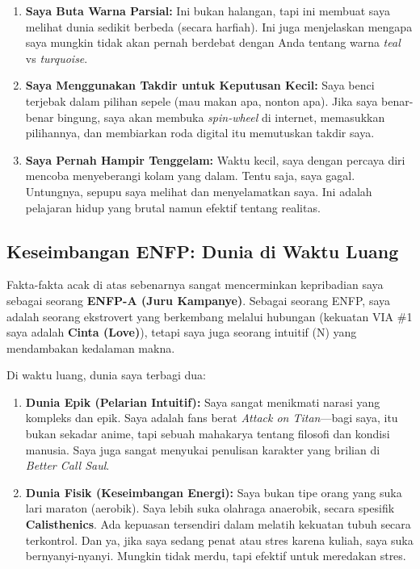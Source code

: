 \documentclass[
  letterpaper,
  DIV=11,
  numbers=noendperiod]{scrreprt}
\providecommand{\tightlist}{%
  \setlength{\itemsep}{0pt}\setlength{\parskip}{0pt}}
\begin{document}
\begin{enumerate}
\def\labelenumi{\arabic{enumi}.}
\tightlist
\item
  \textbf{Saya Buta Warna Parsial:} Ini bukan halangan, tapi ini membuat
  saya melihat dunia sedikit berbeda (secara harfiah). Ini juga
  menjelaskan mengapa saya mungkin tidak akan pernah berdebat dengan
  Anda tentang warna \emph{teal} vs \emph{turquoise}.
\item
  \textbf{Saya Menggunakan Takdir untuk Keputusan Kecil:} Saya benci
  terjebak dalam pilihan sepele (mau makan apa, nonton apa). Jika saya
  benar-benar bingung, saya akan membuka \emph{spin-wheel} di internet,
  memasukkan pilihannya, dan membiarkan roda digital itu memutuskan
  takdir saya.
\item
  \textbf{Saya Pernah Hampir Tenggelam:} Waktu kecil, saya dengan
  percaya diri mencoba menyeberangi kolam yang dalam. Tentu saja, saya
  gagal. Untungnya, sepupu saya melihat dan menyelamatkan saya. Ini
  adalah pelajaran hidup yang brutal namun efektif tentang realitas.
\end{enumerate}

\subsection{Keseimbangan ENFP: Dunia di Waktu
Luang}\label{keseimbangan-enfp-dunia-di-waktu-luang}

Fakta-fakta acak di atas sebenarnya sangat mencerminkan kepribadian saya
sebagai seorang \textbf{ENFP-A (Juru Kampanye)}. Sebagai seorang ENFP,
saya adalah seorang ekstrovert yang berkembang melalui hubungan
(kekuatan VIA \#1 saya adalah \textbf{Cinta (Love)}), tetapi saya juga
seorang intuitif (N) yang mendambakan kedalaman makna.

Di waktu luang, dunia saya terbagi dua:

\begin{enumerate}
\def\labelenumi{\arabic{enumi}.}
\item
  \textbf{Dunia Epik (Pelarian Intuitif):} Saya sangat menikmati narasi
  yang kompleks dan epik. Saya adalah fans berat \emph{Attack on
  Titan}---bagi saya, itu bukan sekadar anime, tapi sebuah mahakarya
  tentang filosofi dan kondisi manusia. Saya juga sangat menyukai
  penulisan karakter yang brilian di \emph{Better Call Saul}.
\item
  \textbf{Dunia Fisik (Keseimbangan Energi):} Saya bukan tipe orang yang
  suka lari maraton (aerobik). Saya lebih suka olahraga anaerobik,
  secara spesifik \textbf{Calisthenics}. Ada kepuasan tersendiri dalam
  melatih kekuatan tubuh secara terkontrol. Dan ya, jika saya sedang
  penat atau stres karena kuliah, saya suka bernyanyi-nyanyi. Mungkin
  tidak merdu, tapi efektif untuk meredakan stres.
\end{enumerate}
\end{document}
